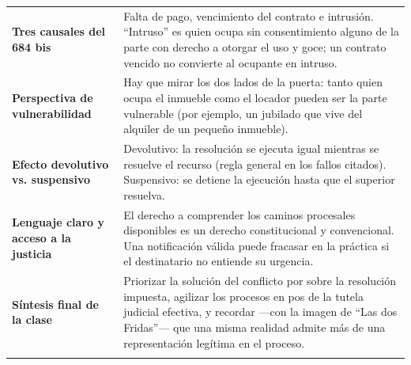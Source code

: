 \documentclass[12pt,oneside]{book}
\begin{document}
\begin{longtable}{
    >{\RaggedRight\arraybackslash}p{}
    >{\RaggedRight\arraybackslash}p{}
}
\textbf{Tres causales del 684 bis} &
Falta de pago, vencimiento del contrato e intrusión. ``Intruso'' es quien ocupa sin consentimiento alguno de la parte con derecho a otorgar el uso y goce; un contrato vencido no convierte al ocupante en intruso. \\
\addlinespace
\cmidrule{1-2}

\textbf{Perspectiva de vulnerabilidad} &
Hay que mirar los dos lados de la puerta: tanto quien ocupa el inmueble como el locador pueden ser la parte vulnerable (por ejemplo, un jubilado que vive del alquiler de un pequeño inmueble). \\
\addlinespace
\cmidrule{1-2}

\textbf{Efecto devolutivo vs. suspensivo} &
Devolutivo: la resolución se ejecuta igual mientras se resuelve el recurso (regla general en los fallos citados). Suspensivo: se detiene la ejecución hasta que el superior resuelva. \\
\addlinespace
\cmidrule{1-2}

\textbf{Lenguaje claro y acceso a la justicia} &
El derecho a comprender los caminos procesales disponibles es un derecho constitucional y convencional. Una notificación válida puede fracasar en la práctica si el destinatario no entiende su urgencia. \\
\addlinespace
\cmidrule{1-2}

\textbf{Síntesis final de la clase} &
Priorizar la solución del conflicto por sobre la resolución impuesta, agilizar los procesos en pos de la tutela judicial efectiva, y recordar ---con la imagen de ``Las dos Fridas''--- que una misma realidad admite más de una representación legítima en el proceso. \\
\addlinespace
\midrule


\end{longtable}
\end{document}
